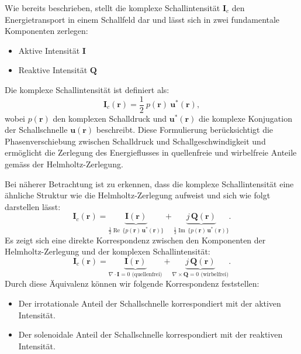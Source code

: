 Wie bereits beschrieben, stellt die komplexe Schallintensität $\boldsymbol{I}_c$ den Energietransport in einem Schallfeld dar und lässt sich in zwei fundamentale Komponenten zerlegen:
 
\begin{itemize}
\item Aktive Intensität $\boldsymbol{I}$
\item Reaktive Intensität $\boldsymbol{Q}$
\end{itemize}
Die komplexe Schallintensität ist definiert als:
\begin{equation}
\boldsymbol{I}_c (\boldsymbol{r}) = \frac{1}{2} \: p(\boldsymbol{r}) \: \boldsymbol{u}^{*}(\boldsymbol{r}),
\end{equation}
wobei $p(\boldsymbol{r})$ den komplexen Schalldruck und $\boldsymbol{u}^{*}(\boldsymbol{r})$ die komplexe Konjugation der Schallschnelle $\boldsymbol{u}(\boldsymbol{r})$ beschreibt. Diese Formulierung berücksichtigt die Phasenverschiebung zwischen Schalldruck und Schallgeschwindigkeit und ermöglicht die Zerlegung des Energieflusses in quellenfreie und wirbelfreie Anteile gemäss der Helmholtz-Zerlegung.
 
Bei näherer Betrachtung ist zu erkennen, dass die komplexe Schallintensität eine ähnliche Struktur wie die Helmholtz-Zerlegung aufweist und sich wie folgt darstellen lässt:
\begin{equation}
\boldsymbol{I}_c (\boldsymbol{r}) = \underbrace{\boldsymbol{I}(\boldsymbol{r})}_{\frac{1}{2} \operatorname{Re} \, \{ p(\boldsymbol{r}) \, \boldsymbol{u}^*(\boldsymbol{r}) \}} + \underbrace{j\,\boldsymbol{Q}(\boldsymbol{r})}_{\frac{1}{2} \operatorname{Im} \, \{ p(\boldsymbol{r}) \, \boldsymbol{u}^*(\boldsymbol{r}) \}}.
\end{equation}
Es zeigt sich eine direkte Korrespondenz zwischen den Komponenten der Helmholtz-Zerlegung und der komplexen Schallintensität:
\begin{equation}
\boldsymbol{I}_c (\boldsymbol{r}) = \underbrace{\boldsymbol{I}(\boldsymbol{r})}_{\nabla \cdot \boldsymbol{I} = 0 \text{ (quellenfrei)}} + \underbrace{j\,\boldsymbol{Q}(\boldsymbol{r})}_{\nabla \times \boldsymbol{Q} = 0 \text{ (wirbelfrei)}}.
\end{equation}
Durch diese Äquivalenz können wir folgende Korrespondenz feststellen:
 
\begin{itemize}
\item Der irrotationale Anteil der Schallschnelle korrespondiert mit der aktiven Intensität.
\item Der solenoidale Anteil der Schallschnelle korrespondiert mit der reaktiven Intensität.
\end{itemize}

